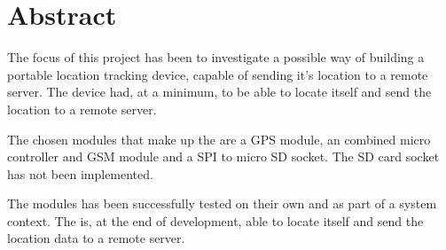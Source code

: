 
\chapter{Abstract}
\label{sec:Abstract}
The focus of this project has been to investigate a possible way of building a portable location tracking device, capable of sending it's location to a remote server.
The device had, at a minimum, to be able to locate itself and send the location to a remote server.

The chosen modules that make up the \systemName are a \GPS GPS module, an \MKR combined micro controller and GSM module and a \SDsock SPI to micro SD socket.
The SD card socket has not been implemented.

The modules has been successfully tested on their own and as part of a system context.
The \systemName is, at the end of development, able to locate itself and send the location data to a remote server.